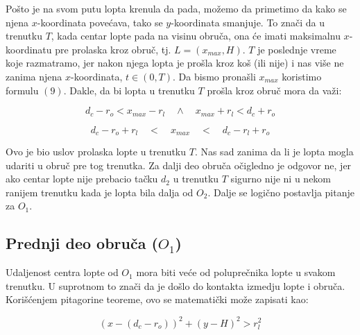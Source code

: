 \documentclass[a4paper, 12pt]{article}
\begin{document}
Pošto je na svom putu lopta krenula da pada, možemo da primetimo da kako se njena $x$-koordinata povećava, tako se $y$-koordinata smanjuje. To znači da u trenutku $T$, kada centar lopte pada na visinu obruča, ona će imati maksimalnu $x$-koordinatu pre prolaska kroz obruč, tj. $L = (x_{max},H)$. $T$ je poslednje vreme koje razmatramo, jer nakon njega lopta je prošla kroz koš (ili nije) i nas više ne zanima njena $x$-koordinata, $t \in (0,T)$. Da bismo pronašli $x_{max}$ koristimo formulu $(9)$. Dakle, da bi lopta u trenutku $T$ prošla kroz obruč mora da važi:

\[ d_c - r_o < x_{max} - r_l \quad \land \quad x_{max} + r_l < d_c + r_o \]

\begin{equation}
d_c - r_o + r_l \quad < \quad x_{max} \quad < \quad d_c - r_l + r_o
\end{equation}



Ovo je bio uslov prolaska lopte u trenutku $T$. Nas sad zanima da li je lopta mogla udariti u obruč pre tog trenutka. Za dalji deo obruča očigledno je odgovor ne, jer ako centar lopte nije prebacio tačku $d_2$ u trenutku $T$ sigurno nije ni u nekom ranijem trenutku kada je lopta bila dalja od $O_2$. Dalje se logično postavlja pitanje za $O_1$.



\subsection{Prednji deo obruča ($O_1$)}

Udaljenost centra lopte od $O_1$ mora biti veće od poluprečnika lopte u svakom trenutku. U suprotnom to znači da je došlo do kontakta izmedju lopte i obruča. Korišćenjem pitagorine teoreme, ovo se matematički može zapisati kao:

\begin{equation}
(x - (d_c - r_o))^2 + (y - H)^2 > r_l^2
\end{equation}
\end{document}
